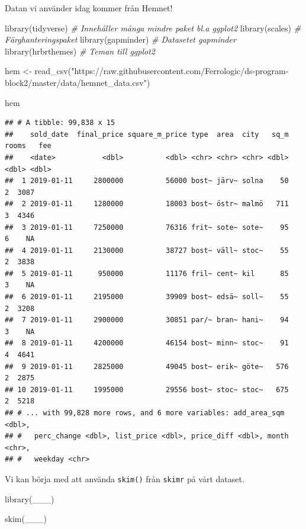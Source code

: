\documentclass[
]{book}
\newenvironment{Shaded}{\begin{snugshade}}{\end{snugshade}}
\newcommand{\CommentTok}[1]{\textcolor[rgb]{0.56,0.35,0.01}{\textit{#1}}}
\newcommand{\FunctionTok}[1]{\textcolor[rgb]{0.00,0.00,0.00}{#1}}
\newcommand{\NormalTok}[1]{#1}
\newcommand{\OtherTok}[1]{\textcolor[rgb]{0.56,0.35,0.01}{#1}}
\newcommand{\StringTok}[1]{\textcolor[rgb]{0.31,0.60,0.02}{#1}}
\begin{document}
Datan vi använder idag kommer från Hemnet!

\begin{Shaded}
\begin{Highlighting}[]
\FunctionTok{library}\NormalTok{(tidyverse)      }\CommentTok{\# Innehåller många mindre paket bl.a ggplot2}
\FunctionTok{library}\NormalTok{(scales)         }\CommentTok{\# Färghanteringspaket}
\FunctionTok{library}\NormalTok{(gapminder)      }\CommentTok{\# Datasetet gapminder}
\FunctionTok{library}\NormalTok{(hrbrthemes)     }\CommentTok{\# Teman till ggplot2}

\NormalTok{hem }\OtherTok{\textless{}{-}} \FunctionTok{read\_csv}\NormalTok{(}\StringTok{"https://raw.githubusercontent.com/Ferrologic/ds{-}program{-}block2/master/data/hemnet\_data.csv"}\NormalTok{)}

\NormalTok{hem}
\end{Highlighting}
\end{Shaded}

\begin{verbatim}
## # A tibble: 99,838 x 15
##    sold_date  final_price square_m_price type  area  city   sq_m rooms   fee
##    <date>           <dbl>          <dbl> <chr> <chr> <chr> <dbl> <dbl> <dbl>
##  1 2019-01-11     2800000          56000 bost~ järv~ solna    50     2  3087
##  2 2019-01-11     1280000          18003 bost~ östr~ malmö   711     3  4346
##  3 2019-01-11     7250000          76316 frit~ sote~ sote~    95     6    NA
##  4 2019-01-11     2130000          38727 bost~ väll~ stoc~    55     2  3838
##  5 2019-01-11      950000          11176 fril~ cent~ kil      85     3    NA
##  6 2019-01-11     2195000          39909 bost~ edsä~ soll~    55     2  3208
##  7 2019-01-11     2900000          30851 par/~ bran~ hani~    94     3    NA
##  8 2019-01-11     4200000          46154 bost~ minn~ stoc~    91     4  4641
##  9 2019-01-11     2825000          49045 bost~ erik~ göte~   576     2  2875
## 10 2019-01-11     1995000          29556 bost~ stoc~ stoc~   675     2  5218
## # ... with 99,828 more rows, and 6 more variables: add_area_sqm <dbl>,
## #   perc_change <dbl>, list_price <dbl>, price_diff <dbl>, month <chr>,
## #   weekday <chr>
\end{verbatim}

Vi kan börja med att använda \texttt{skim()} från \texttt{skimr} på vårt dataset.

\begin{Shaded}
\begin{Highlighting}[]
\FunctionTok{library}\NormalTok{(\_\_\_)}

\FunctionTok{skim}\NormalTok{(\_\_\_)}
\end{Highlighting}
\end{Shaded}
\end{document}
